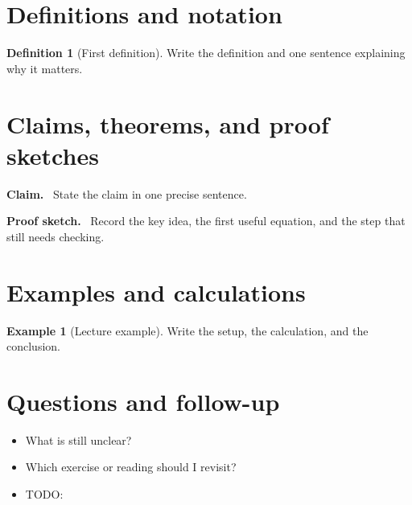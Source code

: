 \documentclass[11pt]{article}
\newcommand{\1}{\mathbf{1}}
\theoremstyle{notestyle}
\theoremstyle{definition}
\newtheorem{definition}[theorem]{Definition}
\newtheorem{example}[theorem]{Example}
\newenvironment{claim}{\par\noindent\textbf{Claim.}\ }{\par}
\newenvironment{proofsketch}{\par\noindent\textbf{Proof sketch.}\ }{\par}
\begin{document}
\section{Definitions and notation}
\begin{definition}[First definition]
Write the definition and one sentence explaining why it matters.
\end{definition}

\section{Claims, theorems, and proof sketches}
\begin{claim}
State the claim in one precise sentence.
\end{claim}

\begin{proofsketch}
Record the key idea, the first useful equation, and the step that still needs checking.
\end{proofsketch}

\section{Examples and calculations}
\begin{example}[Lecture example]
Write the setup, the calculation, and the conclusion.
\end{example}

\section{Questions and follow-up}
\begin{itemize}
  \item What is still unclear?
  \item Which exercise or reading should I revisit?
  \item TODO:
\end{itemize}
\end{document}
